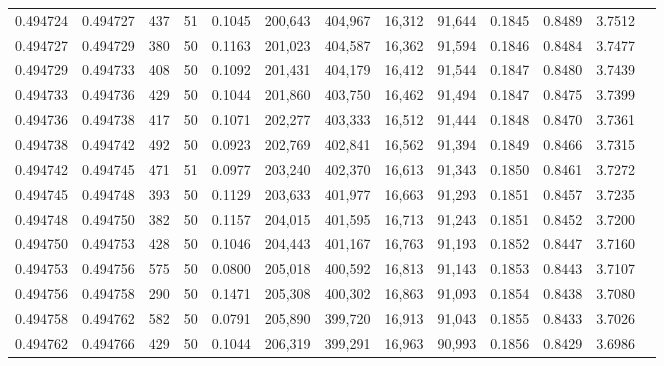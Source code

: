 \begin{tabular}{rrrrrrrrrrrrr}
0.494724 & 0.494727 &   437 &  51 &                                     0.1045 & 200,643 & 404,967 &  16,312 &  91,644 & 0.1845 & 0.8489 & 3.7512 \\
0.494727 & 0.494729 &   380 &  50 &                                     0.1163 & 201,023 & 404,587 &  16,362 &  91,594 & 0.1846 & 0.8484 & 3.7477 \\
0.494729 & 0.494733 &   408 &  50 &                                     0.1092 & 201,431 & 404,179 &  16,412 &  91,544 & 0.1847 & 0.8480 & 3.7439 \\
0.494733 & 0.494736 &   429 &  50 &                                     0.1044 & 201,860 & 403,750 &  16,462 &  91,494 & 0.1847 & 0.8475 & 3.7399 \\
0.494736 & 0.494738 &   417 &  50 &                                     0.1071 & 202,277 & 403,333 &  16,512 &  91,444 & 0.1848 & 0.8470 & 3.7361 \\
0.494738 & 0.494742 &   492 &  50 &                                     0.0923 & 202,769 & 402,841 &  16,562 &  91,394 & 0.1849 & 0.8466 & 3.7315 \\
0.494742 & 0.494745 &   471 &  51 &                                     0.0977 & 203,240 & 402,370 &  16,613 &  91,343 & 0.1850 & 0.8461 & 3.7272 \\
0.494745 & 0.494748 &   393 &  50 &                                     0.1129 & 203,633 & 401,977 &  16,663 &  91,293 & 0.1851 & 0.8457 & 3.7235 \\
0.494748 & 0.494750 &   382 &  50 &                                     0.1157 & 204,015 & 401,595 &  16,713 &  91,243 & 0.1851 & 0.8452 & 3.7200 \\
0.494750 & 0.494753 &   428 &  50 &                                     0.1046 & 204,443 & 401,167 &  16,763 &  91,193 & 0.1852 & 0.8447 & 3.7160 \\
0.494753 & 0.494756 &   575 &  50 &                                     0.0800 & 205,018 & 400,592 &  16,813 &  91,143 & 0.1853 & 0.8443 & 3.7107 \\
0.494756 & 0.494758 &   290 &  50 &                                     0.1471 & 205,308 & 400,302 &  16,863 &  91,093 & 0.1854 & 0.8438 & 3.7080 \\
0.494758 & 0.494762 &   582 &  50 &                                     0.0791 & 205,890 & 399,720 &  16,913 &  91,043 & 0.1855 & 0.8433 & 3.7026 \\
0.494762 & 0.494766 &   429 &  50 &                                     0.1044 & 206,319 & 399,291 &  16,963 &  90,993 & 0.1856 & 0.8429 & 3.6986 \\

\end{tabular}
